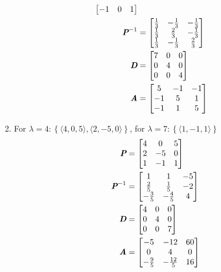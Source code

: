 \documentclass{article}
\begin{document}
\begin{enumerate}[label = \textbf{\arabic*)}]
\begin{align*}
\begin{bmatrix}
					-1 & 0 & 1
				\end{bmatrix} \\
			\matr{P}^{-1} & =
				\begin{bmatrix}
					\frac{1}{3} & -\frac{1}{3} & -\frac{1}{3} \\
					\frac{1}{3} & \frac{2}{3} & -\frac{1}{3} \\
					\frac{1}{3} & -\frac{1}{3} & \frac{2}{3}
				\end{bmatrix} \\
			\matr{D} & =
				\begin{bmatrix}
					7 & 0 & 0 \\
					0 & 4 & 0 \\
					0 & 0 & 4
				\end{bmatrix} \\
			\matr{A} & =
				\begin{bmatrix}
					5 & -1 & -1 \\
					-1 & 5 & 1 \\
					-1 & 1 & 5
				\end{bmatrix}
		\end{align*}
	\item For $ \lambda = 4 : \left\{ \langle 4, 0, 5 \rangle, \langle 2, -5, 0 \rangle \right\} $, for $ \lambda = 7 : \left\{ \langle 1, -1, 1 \rangle \right\} $
		\begin{align*}
			\matr{P} & =
				\begin{bmatrix}
					4 & 0 & 5 \\
					2 & -5 & 0 \\
					1 & -1 & 1
				\end{bmatrix} \\
			\matr{P}^{-1} & =
				\begin{bmatrix}
					1 & 1 & -5 \\
					\frac{2}{5} & \frac{1}{5} & -2 \\
					-\frac{3}{5} & -\frac{4}{5} & 4
				\end{bmatrix} \\
			\matr{D} & =
				\begin{bmatrix}
					4 & 0 & 0 \\
					0 & 4 & 0 \\
					0 & 0 & 7
				\end{bmatrix} \\
			\matr{A} & =
				\begin{bmatrix}
					-5 & -12 & 60 \\
					0 & 4 & 0 \\
					-\frac{9}{5} & -\frac{12}{5} & 16
				\end{bmatrix}
		\end{align*}
\end{enumerate}
\end{document}
